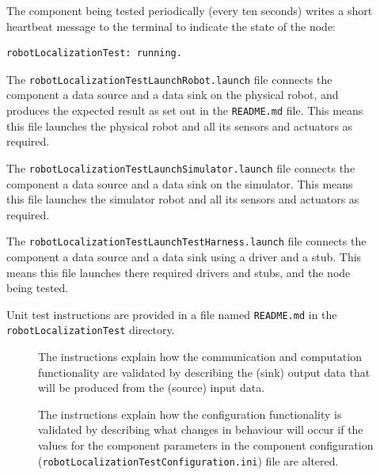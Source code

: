 \documentclass{CSSRforAfrica}
\newcommand{\checkboxChecked}{\fbox{\ding{51}}} %
\newcommand{\checkboxDashed}{\fbox{--}}         %
\begin{document}
\begin{description}
\item[\checkboxChecked] The component being tested periodically (every ten seconds) writes a short heartbeat message to the terminal to indicate the state of the node:
{\small
\begin{verbatim}
robotLocalizationTest: running.
\end{verbatim}
}

\item[\checkboxChecked] The {\small \verb+robotLocalizationTestLaunchRobot.launch+} file  connects the component a data source and a data sink on the physical robot, and produces the expected result as set out in the  \small {\texttt{README.md}}   file.    This means this file launches the physical robot and all its sensors and actuators as required.

\item[\checkboxDashed] The {\small \verb+robotLocalizationTestLaunchSimulator.launch+} file  connects the component a data source and a data sink on the simulator.    This means this file launches the simulator robot and all its sensors and actuators as required.

\item[\checkboxChecked] The {\small \verb+robotLocalizationTestLaunchTestHarness.launch+} file  connects the component a data source and a data sink using a driver and a stub.   This means this file launches there required drivers and stubs, and the node being tested.

\item[\checkboxChecked] Unit test instructions are provided in a file named {\small \verb+README.md+} in the {\small \verb+robotLocalizationTest+} directory.

\begin{description}

\item[\checkboxChecked] The instructions  explain how the  communication and computation functionality are validated by describing the (sink) output data that will be produced from the (source) input data.  

\item[\checkboxChecked] The instructions  explain how the  configuration functionality is validated by describing what changes in behaviour will occur if the values for the component parameters in the component configuration ({\small \verb+robotLocalizationTestConfiguration.ini+}) file are altered.

\end{description}
\end{description}
\newpage
\end{document}
